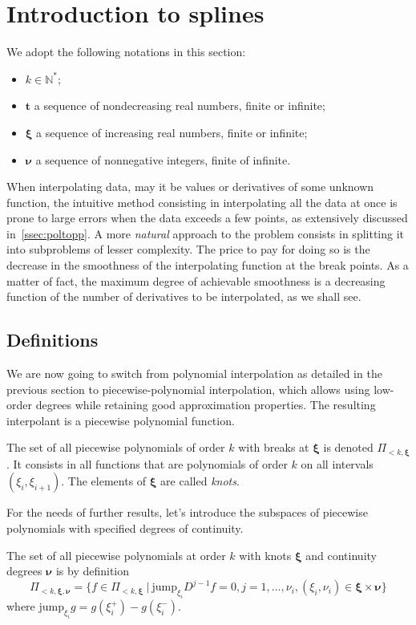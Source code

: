 \section{Introduction to splines}\label{sec:splines}
We adopt the following notations in this section:
\begin{itemize}
  \itemsep0em
  \item $k \in \mathbb{N}^*$;
  \item $\bm{t}$ a sequence of nondecreasing real numbers, finite or infinite;
  \item $\bm{\xi}$ a sequence of increasing real numbers, finite or infinite;
  \item $\bm{\nu}$ a sequence of nonnegative integers, finite of infinite.
\end{itemize}

When interpolating data, may it be values or derivatives of some unknown function, the intuitive method consisting in 
interpolating all the data at once is prone to large errors when the data exceeds a few points, as extensively discussed 
in~\ref{ssec:poltopp}. A more \emph{natural} approach to the problem consists in splitting it into subproblems of lesser 
complexity. The price to pay for doing so is the decrease in the smoothness of the interpolating function at the break 
points. As a matter of fact, the maximum degree of achievable smoothness is a decreasing function of the number of 
derivatives to be interpolated, as we shall see.

\subsection{Definitions}
We are now going to switch from polynomial interpolation as detailed in the previous section to piecewise-polynomial 
interpolation, which allows using low-order degrees while retaining good approximation properties. The resulting 
interpolant is a piecewise polynomial function.
\begin{deftn}
   The set of all piecewise polynomials of order $k$ with breaks at $\bm {\xi}$ is denoted $\Pi_{<k, \bm{\xi}}$. It 
   consists in all functions that are polynomials of order $k$ on all intervals $(\xi_i, \xi_{i+1})$. The elements of 
   $\bm{\xi}$ are called \emph{knots}.
\end{deftn}
For the needs of further results, let's introduce the subspaces of piecewise polynomials with specified degrees of 
continuity.
\begin{deftn}\label{def:ppol-cont}
  The set of all piecewise polynomials at order $k$ with knots $\bm{\xi}$ and continuity degrees $\bm{\nu}$ is by 
  definition
  \begin{equation}
    \Pi_{<k, \bm{\xi}, \bm{\nu}} = \{f \in \Pi_{<k, \bm{\xi}} \ | \ \text{jump}_{\xi_i} D^{j-1}f = 0, j=1, \ldots, 
    \nu_i, (\xi_i, \nu_i) \in \bm{\xi}\times\bm{\nu}\}
  \end{equation}
  where $\text{jump}_{\xi_i} g = g(\xi_i^+) - g(\xi_i^-)$.
\end{deftn}

